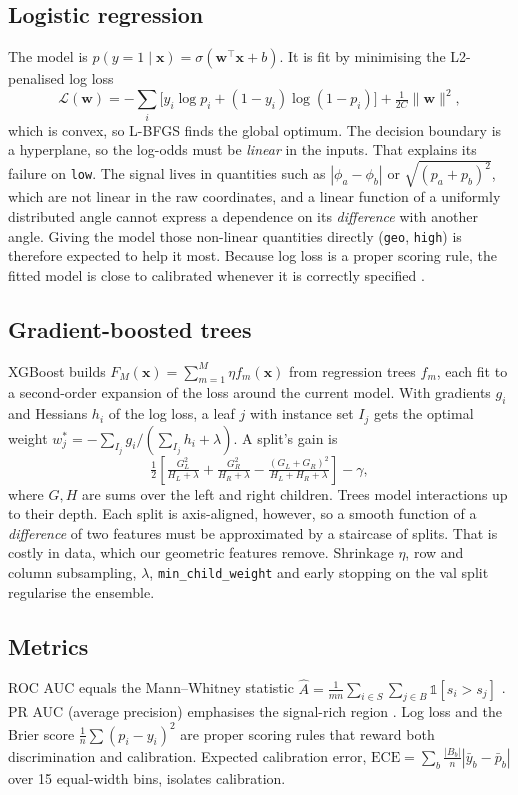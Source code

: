 \documentclass[conference]{IEEEtran}
\begin{document}
\subsection{Logistic regression}
The model is $p(y{=}1\mid\mathbf x)=\sigma(\mathbf w^\top\mathbf x+b)$. It is fit by minimising the
L2-penalised log loss
\begin{equation}
\mathcal L(\mathbf w)=-\sum_i\bigl[y_i\log p_i+(1-y_i)\log(1-p_i)\bigr]+\tfrac{1}{2C}\|\mathbf w\|^2,
\end{equation}
which is convex, so L-BFGS finds the global optimum. The decision boundary is a hyperplane, so the
log-odds must be \emph{linear} in the inputs. That explains its failure on \texttt{low}. The signal
lives in quantities such as $|\phi_a-\phi_b|$ or $\sqrt{(p_a+p_b)^2}$, which are not linear in the
raw coordinates, and a linear function of a uniformly distributed angle cannot express a
dependence on its \emph{difference} with another angle. Giving the model those non-linear quantities
directly (\texttt{geo}, \texttt{high}) is therefore expected to help it most. Because log loss is a
proper scoring rule, the fitted model is close to calibrated whenever it is correctly specified
\cite{niculescu2005predicting}.

\subsection{Gradient-boosted trees}
XGBoost \cite{chen2016xgboost} builds $F_M(\mathbf x)=\sum_{m=1}^M\eta f_m(\mathbf x)$ from
regression trees $f_m$, each fit to a second-order expansion of the loss around the current model.
With gradients $g_i$ and Hessians $h_i$ of the log loss, a leaf $j$ with instance set $I_j$ gets the
optimal weight $w_j^*=-\sum_{I_j}g_i/(\sum_{I_j}h_i+\lambda)$. A split's gain is
\begin{equation}
\tfrac12\!\left[\tfrac{G_L^2}{H_L+\lambda}+\tfrac{G_R^2}{H_R+\lambda}-\tfrac{(G_L+G_R)^2}{H_L+H_R+\lambda}\right]-\gamma,
\end{equation}
where $G,H$ are sums over the left and right children. Trees model interactions up to their depth.
Each split is axis-aligned, however, so a smooth function of a \emph{difference} of two features must be
approximated by a staircase of splits. That is costly in data, which our geometric features remove.
Shrinkage $\eta$, row and column subsampling, $\lambda$, \texttt{min\_child\_weight} and early
stopping on the val split regularise the ensemble.

\subsection{Metrics}
ROC AUC equals the Mann--Whitney statistic
$\hat A=\frac1{mn}\sum_{i\in S}\sum_{j\in B}\mathbb 1[s_i>s_j]$ \cite{fawcett2006roc}. PR AUC (average
precision) emphasises the signal-rich region \cite{saito2015precision}. Log loss and the Brier score
$\frac1n\sum(p_i-y_i)^2$ are proper scoring rules that reward both discrimination and calibration.
Expected calibration error, $\mathrm{ECE}=\sum_b\frac{|B_b|}{n}|\bar y_b-\bar p_b|$ over 15
equal-width bins, isolates calibration.
\end{document}
